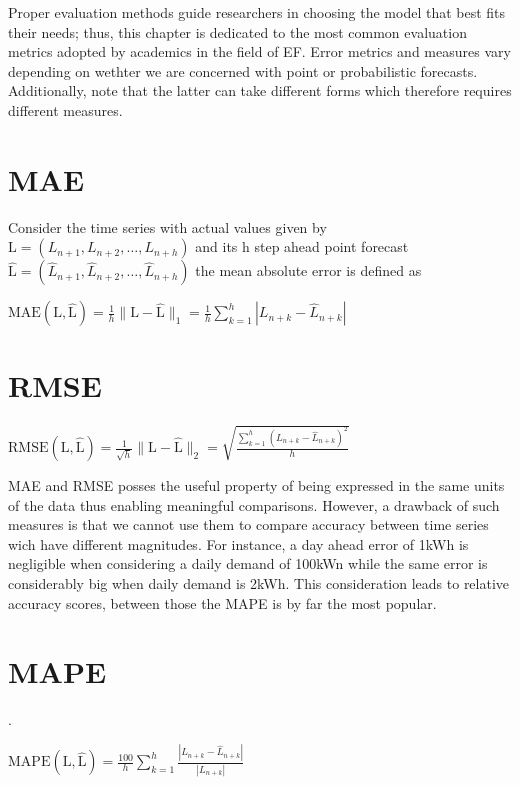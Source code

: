 Proper evaluation methods guide researchers in choosing the model that best fits their needs; thus, this chapter is dedicated to the most common evaluation metrics adopted by academics in the field of EF. Error metrics and measures vary depending on wethter we are concerned with point or probabilistic forecasts. Additionally, note that the latter can take different forms which therefore requires different measures.
\section{MAE}\label{mae}
Consider the time series with actual values given by $\mathrm{L}=(L_{n+1}, L_{n+2},\dots, L_{n+h})$
and its h step ahead point forecast $\mathrm{\hat{L}}=(\hat{L}_{n+1}, \hat{L}_{n+2},\dots, \hat{L}_{n+h})$ the mean absolute error is defined as
\begin{definition}
    $\mathrm{MAE}(\mathrm{L},\mathrm{\hat{L}})=\frac{1}{h}\|\mathrm{L}-\mathrm{\hat{L}}\|_{1}=\frac{1}{h}\sum\limits_{k=1}^{h}|L_{n+k}-\hat{L}_{n+k}|$
\end{definition}

\section{RMSE}\label{rmse}
\begin{definition}
    $\mathrm{RMSE(\mathrm{L}, \mathrm{\hat{L}})}=\frac{1}{\sqrt{h}}\|\mathrm{L}-\mathrm{\hat{L}}\|_{2}=\sqrt{\frac{\sum\limits_{k=1}^{h}(L_{n+k}- \hat{L}_{n+k})^2}{h}}$
\end{definition}

MAE and RMSE posses the useful property of being expressed in the same units of the data thus enabling meaningful comparisons.
However, a drawback of such measures is that we cannot use them to compare accuracy between time series wich have different magnitudes. For instance, a day ahead error of 1kWh is negligible when considering a daily demand of 100kWn while the same error is considerably big when daily demand is 2kWh. This consideration leads to relative accuracy scores, between those the MAPE is by far the most popular.


\section{MAPE}\label{mape}. 
\begin{definition}
    $\mathrm{MAPE}(\mathrm{L},\mathrm{\hat{L}})=\frac{100}{h}\sum\limits_{k=1}^{h}\frac{|L_{n+k}-\hat{L}_{n+k}|}{|L_{n+k}|}$
\end{definition}


